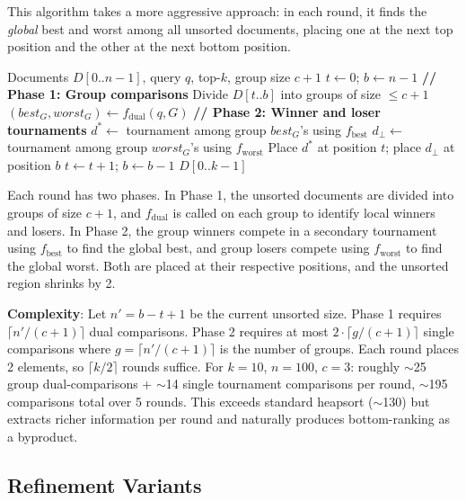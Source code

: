 This algorithm takes a more aggressive approach: in each round, it finds the \emph{global} best and worst among all unsorted documents, placing one at the next top position and the other at the next bottom position.

\begin{algorithm}[!htbp]
\caption{Double-Ended Selection Sort}
\label{alg:deselection}
\scriptsize
\begin{algorithmic}[1]
\REQUIRE Documents $D[0..n{-}1]$, query $q$, top-$k$, group size $c{+}1$
\STATE $t \leftarrow 0$; $b \leftarrow n-1$
    \STATE \textbf{// Phase 1: Group comparisons}
    \STATE Divide $D[t..b]$ into groups of size $\leq c{+}1$
        \STATE $(best_G, worst_G) \leftarrow f_{\text{dual}}(q, G)$
    \ENDFOR
    \STATE \textbf{// Phase 2: Winner and loser tournaments}
    \STATE $d^* \leftarrow$ tournament among group $best_G$'s using $f_{\text{best}}$
    \STATE $d_\bot \leftarrow$ tournament among group $worst_G$'s using $f_{\text{worst}}$
    \STATE Place $d^*$ at position $t$; place $d_\bot$ at position $b$
    \STATE $t \leftarrow t + 1$; $b \leftarrow b - 1$
\ENDWHILE
\RETURN $D[0..k{-}1]$
\end{algorithmic}
\end{algorithm}

Each round has two phases. In Phase 1, the unsorted documents are divided into groups of size $c+1$, and $f_{\text{dual}}$ is called on each group to identify local winners and losers. In Phase 2, the group winners compete in a secondary tournament using $f_{\text{best}}$ to find the global best, and group losers compete using $f_{\text{worst}}$ to find the global worst. Both are placed at their respective positions, and the unsorted region shrinks by 2.

\textbf{Complexity}: Let $n' = b - t + 1$ be the current unsorted size. Phase 1 requires $\lceil n'/(c+1) \rceil$ dual comparisons. Phase 2 requires at most $2 \cdot \lceil g/(c+1) \rceil$ single comparisons where $g = \lceil n'/(c+1) \rceil$ is the number of groups. Each round places 2 elements, so $\lceil k/2 \rceil$ rounds suffice. For $k=10$, $n=100$, $c=3$: roughly $\sim$25 group dual-comparisons + $\sim$14 single tournament comparisons per round, $\sim$195 comparisons total over 5 rounds. This exceeds standard heapsort ($\sim$130) but extracts richer information per round and naturally produces bottom-ranking as a byproduct.


\subsection{Refinement Variants}
\label{sec:refinement}

